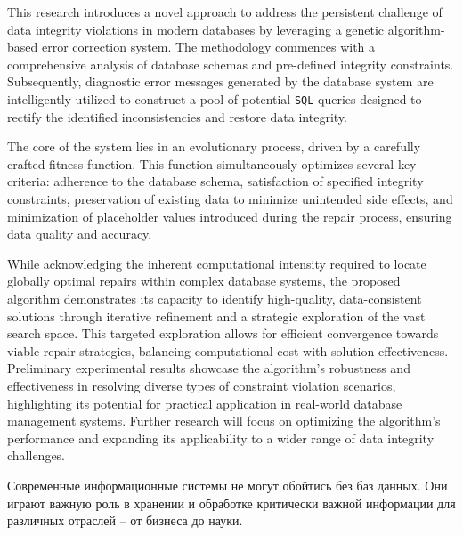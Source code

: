 \documentclass[master,paper]{pmk-graduate}
\begin{document}



\begin{englishabstract}
This research introduces a novel approach to address the persistent challenge of data integrity violations in modern databases by leveraging a genetic algorithm-based error correction system. The methodology commences with a comprehensive analysis of database schemas and pre-defined integrity constraints. Subsequently, diagnostic error messages generated by the database system are intelligently utilized to construct a pool of potential \texttt{SQL} queries designed to rectify the identified inconsistencies and restore data integrity.

The core of the system lies in an evolutionary process, driven by a carefully crafted fitness function. This function simultaneously optimizes several key criteria: adherence to the database schema, satisfaction of specified integrity constraints, preservation of existing data to minimize unintended side effects, and minimization of placeholder values introduced during the repair process, ensuring data quality and accuracy.

While acknowledging the inherent computational intensity required to locate globally optimal repairs within complex database systems, the proposed algorithm demonstrates its capacity to identify high-quality, data-consistent solutions through iterative refinement and a strategic exploration of the vast search space. This targeted exploration allows for efficient convergence towards viable repair strategies, balancing computational cost with solution effectiveness. Preliminary experimental results showcase the algorithm’s robustness and effectiveness in resolving diverse types of constraint violation scenarios, highlighting its potential for practical application in real-world database management systems. Further research will focus on optimizing the algorithm’s performance and expanding its applicability to a wider range of data integrity challenges.
\end{englishabstract}

\maketitlepage
\introduction
\actuality
Современные информационные системы не могут обойтись без баз данных. Они играют важную роль в хранении и обработке критически важной информации для различных отраслей -- от бизнеса до науки.
\end{document}
